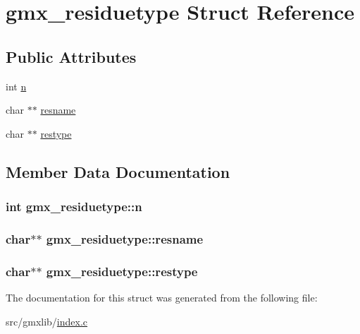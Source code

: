 \hypertarget{structgmx__residuetype}{\section{gmx\-\_\-residuetype \-Struct \-Reference}
\label{structgmx__residuetype}
}
\subsection*{\-Public \-Attributes}
\begin{DoxyCompactItemize}
\item 
int \hyperlink{structgmx__residuetype_aed0a8fc1033ffefa8114a42c3d29229c}{n}
\item 
char $\ast$$\ast$ \hyperlink{structgmx__residuetype_ad16c7f12b7bb3714ef23ebe73b3f933f}{resname}
\item 
char $\ast$$\ast$ \hyperlink{structgmx__residuetype_ae044e8b3015f55bc04e6b67917cd2007}{restype}
\end{DoxyCompactItemize}


\subsection{\-Member \-Data \-Documentation}
\hypertarget{structgmx__residuetype_aed0a8fc1033ffefa8114a42c3d29229c}{
\subsubsection[{n}]{\setlength{\rightskip}{0pt plus 5cm}int {\bf gmx\-\_\-residuetype\-::n}}}\label{structgmx__residuetype_aed0a8fc1033ffefa8114a42c3d29229c}
\hypertarget{structgmx__residuetype_ad16c7f12b7bb3714ef23ebe73b3f933f}{
\subsubsection[{resname}]{\setlength{\rightskip}{0pt plus 5cm}char$\ast$$\ast$ {\bf gmx\-\_\-residuetype\-::resname}}}\label{structgmx__residuetype_ad16c7f12b7bb3714ef23ebe73b3f933f}
\hypertarget{structgmx__residuetype_ae044e8b3015f55bc04e6b67917cd2007}{
\subsubsection[{restype}]{\setlength{\rightskip}{0pt plus 5cm}char$\ast$$\ast$ {\bf gmx\-\_\-residuetype\-::restype}}}\label{structgmx__residuetype_ae044e8b3015f55bc04e6b67917cd2007}


\-The documentation for this struct was generated from the following file\-:\begin{DoxyCompactItemize}
\item 
src/gmxlib/\hyperlink{index_8c}{index.\-c}\end{DoxyCompactItemize}
